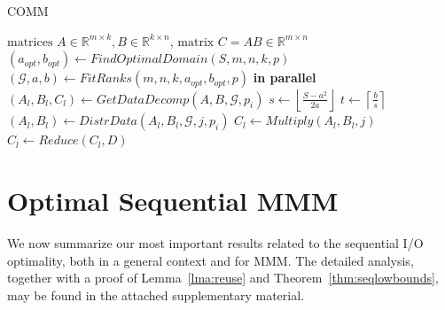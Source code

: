 \documentclass[sigplan,review,anonymous,10pt]{acmart}\settopmatter{printfolios=true,printccs=false,printacmref=false}
\begin{document}
\begin{algorithm}
	\small
\caption{COMM} \label{alg:comm}
\begin{algorithmic}[1]
\Require $\text{matrices } A \in \mathbb{R}^{m \times k}, B \in 
\mathbb{R}^{k \times n}$,
\Ensure $\text{matrix } C = AB \in \mathbb{R}^{m \times n}$
%
%
\State $(a_{opt}, b_{opt}) \gets FindOptimalDomain(S,m,n,k,p)$ 
\label{alg:line:findOptDomain}
%
\State $(\mathcal{G}, a, b) \gets FitRanks(m,n,k,a_{opt},b_{opt},p)$ 
\label{alg:line:fitranks}
 \textbf{in parallel}
\label{alg:line:outerloopStart}
%
\State $(A_l, B_l, C_l) \gets GetDataDecomp(A,B, \mathcal{G}, p_i)$ 
\label{alg:line:datadecomp}
\State $s \gets \left \lfloor{\frac{S - a^2}{2a}}\right \rfloor$
\label{alg:line:stepsize}
\State $t \gets \left \lceil{\frac{b}{s}}\right \rceil$ 
\label{alg:line:steps}
\label{alg:line:innerloopStart}
\State $(A_l, B_l) \gets DistrData(A_l,B_l,\mathcal{G}, j, p_i)$ 
\label{alg:line:distrData}
\State $C_l \gets Multiply(A_l, B_l,j)$ 
\label{alg:line:compute}
\EndFor
\label{alg:line:innerLoopEnd}
\State $C_l \gets Reduce(C_l,D)$ 
\label{alg:line:reduce}
\EndFor
\label{alg:line:outerLoopEnd}
\end{algorithmic}
\end{algorithm}


\section{Optimal Sequential MMM}
\label{sec:seqScheduling}

We now summarize our most important results related to the sequential I/O
optimality, both in a general context and for MMM. The detailed analysis, 
together with a proof of
Lemma~\ref{lma:reuse} and Theorem~\ref{thm:seqlowbounds}, may be found in the
attached supplementary material.
\end{document}
